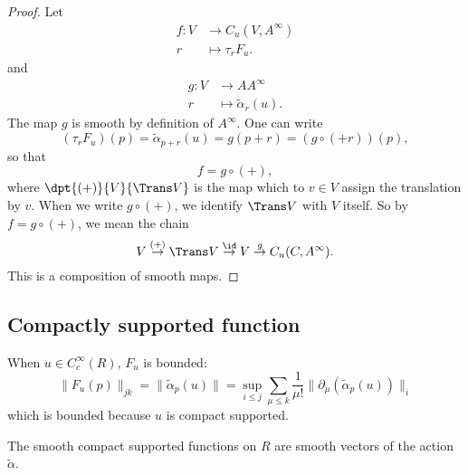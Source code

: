 \begin{proof}
	Let
	\begin{equation}
		\begin{aligned}
			f  \colon V & \to C_u(V,A^{\infty}) \\
			r           & \mapsto \tau_rF_u.
		\end{aligned}
	\end{equation}
	and
	\begin{equation}
		\begin{aligned}
			g  \colon V & \to A A^{\infty}           \\
			r           & \mapsto \tilde\alpha_r(u).
		\end{aligned}
	\end{equation}
	The map $g$ is smooth by definition of $A^{\infty}$. One can write
	\begin{equation}
		(\tau_rF_u)(p)=\tilde\alpha_{p+r}(u)
		=g(p+r)
		=(g\circ (+r))(p),
	\end{equation}
	so that
	\[
		f=g\circ(+),
	\]
	where $\dpt{ (+) }{ V }{ \Trans V }$ is the map which to $v\in V$ assign the translation by $v$. When we write $g\circ(+)$, we identify $\Trans V$ with $V$ itself. So by $f=g\circ(+)$, we mean the chain
	\[
		V  \stackrel{(+)}{\to}  \Trans V\stackrel{\id}{\to} V\stackrel{g}{\to}C_u(C,A^{\infty}).
	\]
	This is a composition of smooth maps.


\end{proof}


\subsection{Compactly supported function}

When $u\in C_c^{\infty}(R)$, $F_u$ is bounded:
\[
	\| F_u(p) \|_{jk}=\| \tilde\alpha_p(u) \|=\sup_{i\leq j}\sum _{\mu\leq k}\frac{1}{ \mu! }\| \partial_{\mu}(\tilde\alpha_p(u)) \|_i
\]
which is bounded because $u$ is compact supported.

\begin{proposition}
	The smooth compact supported functions on $R$ are smooth vectors of the action $\tilde\alpha$.
\end{proposition}

